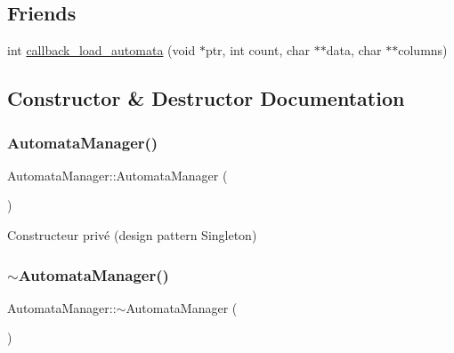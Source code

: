 \subsection*{Friends}
\begin{DoxyCompactItemize}
\item 
int \mbox{\hyperlink{class_automata_manager_a9c75102ca101e7ce8ae9d2c5821b1dbf}{callback\+\_\+load\+\_\+automata}} (void $\ast$ptr, int count, char $\ast$$\ast$data, char $\ast$$\ast$columns)
\end{DoxyCompactItemize}


\subsection{Constructor \& Destructor Documentation}
\mbox{\label{class_automata_manager_a9cdfbfc56a9ad2d2d0631d7a889c83e1}} 
\subsubsection{\texorpdfstring{Automata\+Manager()}{AutomataManager()}}
{\footnotesize\ttfamily Automata\+Manager\+::\+Automata\+Manager (\begin{DoxyParamCaption}{ }\end{DoxyParamCaption})\hspace{0.3cm}{\ttfamily [private]}}



Constructeur privé (design pattern Singleton) 

\mbox{\label{class_automata_manager_a1f919c8a4a4ca089baf3657c26eb4be7}} 
\subsubsection{\texorpdfstring{$\sim$\+Automata\+Manager()}{~AutomataManager()}}
{\footnotesize\ttfamily Automata\+Manager\+::$\sim$\+Automata\+Manager (\begin{DoxyParamCaption}{ }\end{DoxyParamCaption})\hspace{0.3cm}{\ttfamily [virtual]}}



